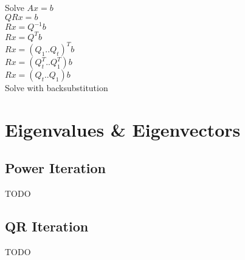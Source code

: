 \documentclass[8pt,letter]{article}
\begin{document}
\begin{multicols*}{2}
    Solve $Ax=b$\\
    $QRx = b$\\
    $Rx = Q^{-1}b$\\
    $Rx = Q^T b$\\
    $Rx = (Q_1 .. Q_t)^T b$\\    
    $Rx = (Q_t^T .. Q_1^T) b$\\
    $Rx = (Q_t .. Q_1) b$\\
    Solve with backsubstitution\\

    \vfill\null
    \pagebreak
    
    \section{Eigenvalues & Eigenvectors}
    
    \subsection{Power Iteration}
    TODO
    
    \subsection{QR Iteration}
    TODO
    
\end{multicols*}
\end{document}
